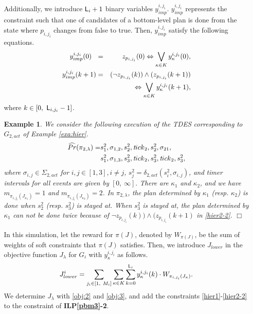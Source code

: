 \documentclass[journal,twoside,web]{IEEEtran}
\newcommand{\qedwhite}{\hfill \ensuremath{\Box}}
\newtheorem{exa}{Example}
\newcommand{\req}[1]{\eqref{#1}}
\renewcommand{\Pr}{\widehat{Pr}}
\newcommand{\tick}{{\sf tick}}
\newcommand{\ttick}{{\textit tick}}
\newcommand{\Len}{{\sf L}}
\begin{document}
Additionally, we introduce $\Len_i + 1$ binary variables $y^{i,j_i}_{{imp}}$.
$y^{i,j_i}_{{imp}}$ represents the constraint such that one of candidates of a bottom-level plan is done from the state where $p_{i,j_i}$ changes from false to true. 
%
Then, $y^{i,j_i}_{{imp}}$ satisfy the following equations.
%
\begin{eqnarray}
y^{i,j_i}_{{imp}}(0)~~ &=& z_{p_{i,{j_i}}}(0) \Leftrightarrow\bigvee_{\kappa\in K} {y}^{i,j_i}_{\kappa}(0),\label{hier2-2-0}\\
y^{i,j_i}_{{imp}}(k+1) &=& (\lnot z_{p_{i,{j_i}}}(k))\land (z_{p_{i,{j_i}}}(k+1)) 
\notag\\&&~\Leftrightarrow\bigvee_{\kappa\in K} {y}^{i,j_i}_{\kappa}(k+1),\label{hier2-2}
\end{eqnarray}
where $k\in[0,~\Len_{i,j_i}-1]$.
%
\begin{exa}
We consider the following execution of the TDES corresponding to $G_{2,act}$ of Example \ref{exa:hier}.
\begin{align}
\Pr(\pi_{2,\lambda})
=&s^2_1,\sigma_{1,2},s^2_2,\ttick_2,s^2_2,\sigma_{21},\notag \\
&s^2_1,\sigma_{1,3},s^2_3,\ttick_2,s^2_3,\ttick_2,s^2_3,\notag
\end{align}
where $\sigma_{i,j}\in\Sigma_{2,act}$ for $i,j\in[1,3],i\neq j$, $s^2_j=\delta_{2,act}(s_i^2,\sigma_{i,j})$, and timer intervals for all events are given by $[0,~\infty]$.
There are $\kappa_1$ and $\kappa_2$, and we have $m_{\pi_{i,j_i}(J_{\kappa_1})}=1$ and $m_{\pi_{i,j_i}(J_{\kappa_2})}=2$.
In $\pi_{2,\lambda}$, the plan determined by $\kappa_1$ ({\sl resp.} $\kappa_2$) is done when $s^2_2$  ({\sl resp.} $s^2_3$) is stayed at.
When $s^2_3$ is stayed at, the plan determined by $\kappa_1$ can not be done twice because of $\lnot z_{p_{i,{j_i}}}(k))\land (z_{p_{i,{j_i}}}(k+1)$ in \req{hier2-2}.
\qedwhite
\end{exa}
%
In this simulation, let the reward for $\pi(J)$, denoted by $W_{\pi(J)}$, be the sum of weights of soft constraints that $\pi(J)$ satisfies.
%
Then, we introduce $J_{lower}$ in the objective function $J_{\lambda}$ for $G_i$ with ${y}^{i,{j_i}}_\kappa$ as follows.
\begin{align}\label{obj:3}
J_{lower}^i=\sum_{j_i\in[1,~M_i]} \sum_{\kappa\in K} \sum_{k=0}^{\Len_i} {y}^{i,{j_i}}_\kappa(k) \cdot {W_{\pi_{i,{j_i}}(J_\kappa)}}.
\end{align}
%
We determine $J_\lambda$ with \req{obj:2} and \req{obj:3}, and add the constraints \req{hier1}-\req{hier2-2} to the constraint of {\bf ILP\ref{pbm3}-2}.
\end{document}

